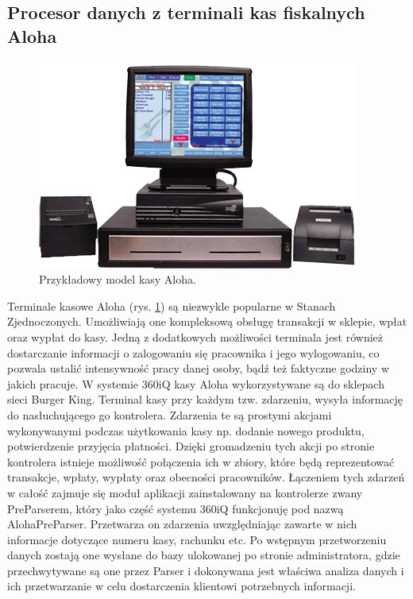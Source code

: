 \documentclass[a4paper]{book}
\begin{document}
\subsection{Procesor danych z terminali kas fiskalnych Aloha}
\begin{figure}[h]
	\centering
	\includegraphics[width=\textwidth]{./img/aloha_pos.png}
	\caption{Przykładowy model kasy Aloha.}
	\label{fig:aloha_pos}
\end{figure}
Terminale kasowe Aloha (rys. \ref{fig:aloha_pos}) są niezwykle popularne w Stanach Zjednoczonych. Umożliwiają one kompleksową obsługę transakcji w sklepie, wpłat oraz wypłat do kasy. Jedną z dodatkowych możliwości terminala jest również dostarczanie informacji o zalogowaniu się pracownika i jego wylogowaniu, co pozwala ustalić intensywność pracy danej osoby, bądź też faktyczne godziny w jakich pracuje. W systemie 360iQ kasy Aloha wykorzystywane są do sklepach sieci Burger King. Terminal kasy przy każdym tzw. zdarzeniu, wysyła informację do nasłuchującego go kontrolera. Zdarzenia te są prostymi akcjami wykonywanymi podczas użytkowania kasy np. dodanie nowego produktu, potwierdzenie przyjęcia płatności. Dzięki gromadzeniu tych akcji po stronie kontrolera istnieje możliwość połączenia ich w zbiory, które będą reprezentować transakcje, wpłaty, wypłaty oraz obecności pracowników. Łączeniem tych zdarzeń w całość zajmuje się moduł aplikacji zainstalowany na kontrolerze zwany PreParserem, który jako część systemu 360iQ funkcjonuję pod nazwą AlohaPreParser. Przetwarza on zdarzenia uwzględniając zawarte w nich informacje dotyczące numeru kasy, rachunku etc.
Po wstępnym przetworzeniu danych zostają one wysłane do bazy ulokowanej po stronie administratora, gdzie przechwytywane są one przez Parser i dokonywana jest właściwa analiza danych i ich przetwarzanie w celu dostarczenia klientowi potrzebnych informacji. 
\end{document}
